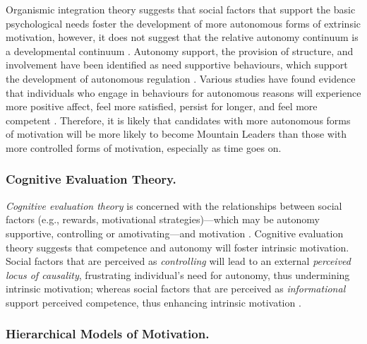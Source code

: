 \documentclass[
  12pt,
  a4paper,
]{book}
\begin{document}
Organismic integration theory suggests that social factors that support the basic psychological needs foster the development of more autonomous forms of extrinsic motivation, however, it does not suggest that the relative autonomy continuum is a developmental continuum \citep{Deci1991, Ryan1995, Ryan2002}. Autonomy support, the provision of structure, and involvement have been identified as need supportive behaviours, which support the development of autonomous regulation \citep{Ryan2016, Markland2010}. Various studies have found evidence that individuals who engage in behaviours for autonomous reasons will experience more positive affect, feel more satisfied, persist for longer, and feel more competent \citep[cf.~][]{Frederick-Recascino2002}. Therefore, it is likely that candidates with more autonomous forms of motivation will be more likely to become Mountain Leaders than those with more controlled forms of motivation, especially as time goes on.

\hypertarget{cognitive-evaluation-theory.}{%
\subsubsection{Cognitive Evaluation Theory.}\label{cognitive-evaluation-theory.}}

\emph{Cognitive evaluation theory} is concerned with the relationships between social factors (e.g., rewards, motivational strategies)---which may be autonomy supportive, controlling or amotivating---and motivation \citep{Deci1975, Deci1980}. Cognitive evaluation theory suggests that competence and autonomy will foster intrinsic motivation. Social factors that are perceived as \emph{controlling} will lead to an external \emph{perceived locus of causality}, frustrating individual's need for autonomy, thus undermining intrinsic motivation; whereas social factors that are perceived as \emph{informational} support perceived competence, thus enhancing intrinsic motivation \citep{Ryan2019}.

\hypertarget{hierarchical-models-of-motivation.}{%
\subsubsection{Hierarchical Models of Motivation.}\label{hierarchical-models-of-motivation.}}
\end{document}
